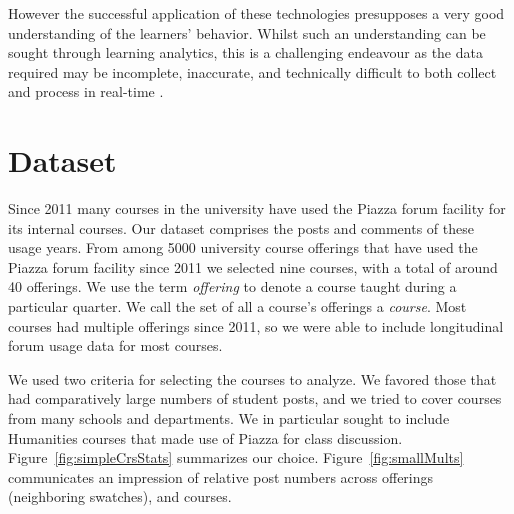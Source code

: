 However the successful application of these technologies presupposes a
very good understanding of the learners' behavior. Whilst such an
understanding can be sought through learning analytics, this is a
challenging endeavour as the data required may be incomplete,
inaccurate, and technically difficult to both collect and process in
real-time \cite{wilde2016understanding}. 


\section{Dataset}

Since 2011 many courses in the university have used the Piazza forum
facility for its internal courses. Our dataset comprises the posts and
comments of these usage years. From among 5000 university course
offerings that have used the Piazza forum facility since 2011 we
selected nine courses, with a total of around 40 offerings. We use the
term {\em offering} to denote a course taught during a particular
quarter. We call the set of all a course's offerings a {\em course}.
Most courses had multiple offerings since 2011, so we were able to
include longitudinal forum usage data for most courses.

We used two criteria for selecting the courses to analyze. We favored
those that had comparatively large numbers of student posts, and we
tried to cover courses from many schools and departments. We in
particular sought to include Humanities courses that made use of
Piazza for class discussion. Figure~\ref{fig:simpleCrsStats}
summarizes our choice. Figure~\ref{fig:smallMults} communicates an
impression of relative post numbers across offerings (neighboring
swatches), and courses.
 
